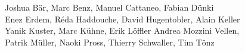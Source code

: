 %
%
%
Joshua Bär,			%
Marc Benz,			%
Manuel Cattaneo,		%
Fabian Dünki%
\\
Enez Erdem,			%
Réda Haddouche,			%
David Hugentobler,		%
Alain Keller%
\\
Yanik Kuster,			%
Marc Kühne,			%
Erik Löffler%
Andrea Mozzini Vellen,		%
\\
Patrik Müller,			%
Naoki Pross,			%
Thierry Schwaller,		%
Tim Tönz			%

